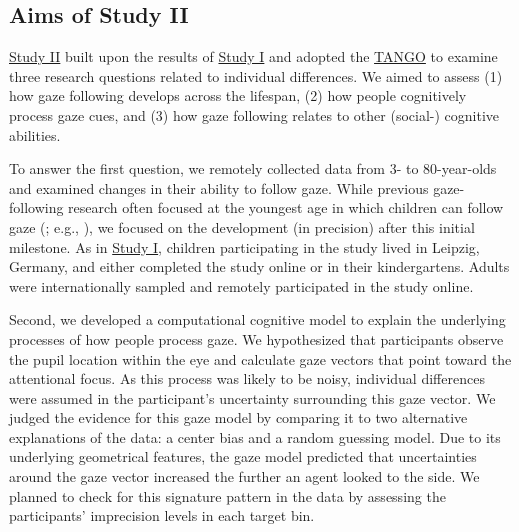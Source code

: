\documentclass[
]{scrbook}
\begin{document}
\subsection{Aims of Study II}\label{aims-studyII}

\hyperref[studyII]{Study II} built upon the results of \hyperref[studyI]{Study I} and adopted the \hyperref[acronyms_TANGO]{TANGO} to examine three research questions related to individual differences. We aimed to assess (1) how gaze following develops across the lifespan, (2) how people cognitively process gaze cues, and (3) how gaze following relates to other (social-) cognitive abilities.

To answer the first question, we remotely collected data from 3- to 80-year-olds and examined changes in their ability to follow gaze. While previous gaze-following research often focused at the youngest age in which children can follow gaze (; e.g., ), we focused on the development (in precision) after this initial milestone. As in \hyperref[studyI]{Study I}, children participating in the study lived in Leipzig, Germany, and either completed the study online or in their kindergartens. Adults were internationally sampled and remotely participated in the study online.

Second, we developed a computational cognitive model to explain the underlying processes of how people process gaze. We hypothesized that participants observe the pupil location within the eye and calculate gaze vectors that point toward the attentional focus. As this process was likely to be noisy, individual differences were assumed in the participant's uncertainty surrounding this gaze vector. We judged the evidence for this gaze model by comparing it to two alternative explanations of the data: a center bias and a random guessing model. Due to its underlying geometrical features, the gaze model predicted that uncertainties around the gaze vector increased the further an agent looked to the side. We planned to check for this signature pattern in the data by assessing the participants' imprecision levels in each target bin.
\end{document}
